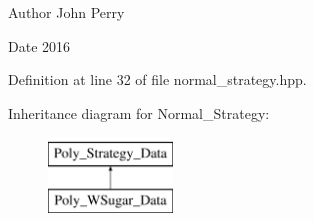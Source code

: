 \begin{DoxyAuthor}{Author}
John Perry 
\end{DoxyAuthor}
\begin{DoxyDate}{Date}
2016 
\end{DoxyDate}


Definition at line 32 of file normal\+\_\+strategy.\+hpp.

Inheritance diagram for Normal\+\_\+\+Strategy\+:\begin{figure}[H]
\begin{center}
\leavevmode
\includegraphics[height=2.000000cm]{group__strategygroup}
\end{center}
\end{figure}
